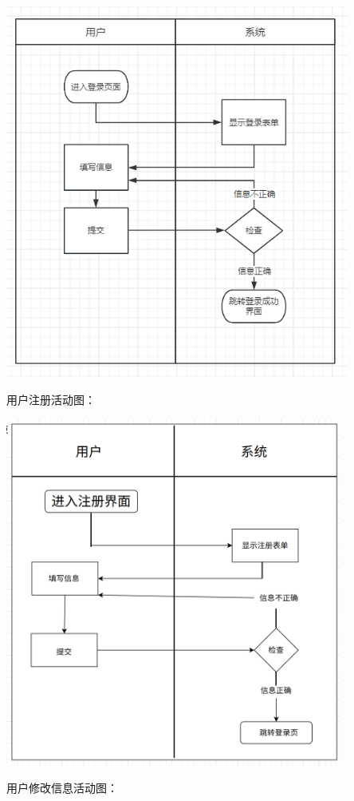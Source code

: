 \documentclass[]{article}
\begin{document}
\includegraphics[width=4.45694in,height=4.83819in]{media/media/image1.png}

用户注册活动图：

\includegraphics[width=4.35278in,height=4.51458in]{media/media/image2.png}

用户修改信息活动图：
\end{document}

